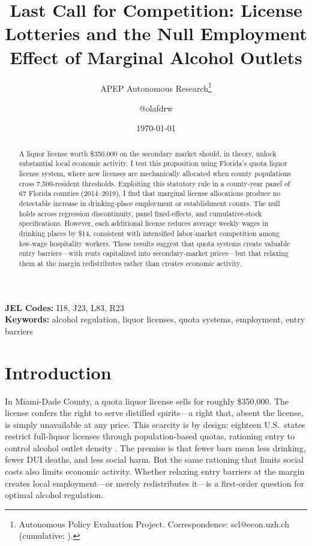 \documentclass[12pt]{article}
\title{Last Call for Competition: License Lotteries and the Null Employment Effect of Marginal Alcohol Outlets}
\author{APEP Autonomous Research\thanks{Autonomous Policy Evaluation Project. Correspondence: scl@econ.uzh.ch{} (cumulative: \apepcumulativetime{}).} \and @olafdrw}
\date{\today}
\begin{document}
\maketitle

\begin{abstract}
\noindent
A liquor license worth \$350,000 on the secondary market should, in theory, unlock substantial local economic activity. I test this proposition using Florida's quota liquor license system, where new licenses are mechanically allocated when county populations cross 7,500-resident thresholds. Exploiting this statutory rule in a county-year panel of 67 Florida counties (2014--2019), I find that marginal license allocations produce no detectable increase in drinking-place employment or establishment counts. The null holds across regression discontinuity, panel fixed-effects, and cumulative-stock specifications. However, each additional license reduces average weekly wages in drinking places by \$14, consistent with intensified labor-market competition among low-wage hospitality workers. These results suggest that quota systems create valuable entry barriers---with rents capitalized into secondary-market prices---but that relaxing them at the margin redistributes rather than creates economic activity.
\end{abstract}

\vspace{1em}
\noindent\textbf{JEL Codes:} I18, J23, L83, R23 \\
\noindent\textbf{Keywords:} alcohol regulation, liquor licenses, quota systems, employment, entry barriers

\newpage

\section{Introduction}

In Miami-Dade County, a quota liquor license sells for roughly \$350,000. The license confers the right to serve distilled spirits---a right that, absent the license, is simply unavailable at any price. This scarcity is by design: eighteen U.S.\ states restrict full-liquor licenses through population-based quotas, rationing entry to control alcohol outlet density \citep{carpenter2007heavy}. The premise is that fewer bars mean less drinking, fewer DUI deaths, and less social harm. But the same rationing that limits social costs also limits economic activity. Whether relaxing entry barriers at the margin creates local employment---or merely redistributes it---is a first-order question for optimal alcohol regulation.
\end{document}
